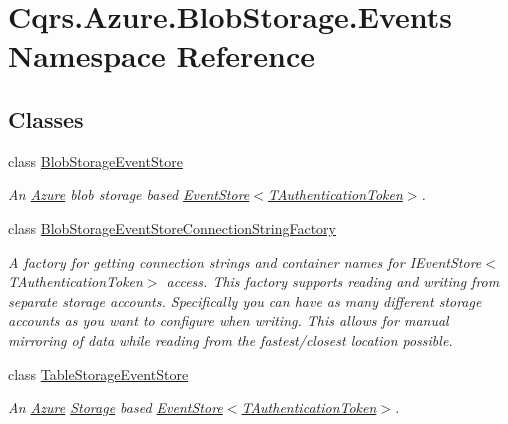 \hypertarget{namespaceCqrs_1_1Azure_1_1BlobStorage_1_1Events}{}\section{Cqrs.\+Azure.\+Blob\+Storage.\+Events Namespace Reference}
\label{namespaceCqrs_1_1Azure_1_1BlobStorage_1_1Events}
\subsection*{Classes}
\begin{DoxyCompactItemize}
\item 
class \hyperlink{classCqrs_1_1Azure_1_1BlobStorage_1_1Events_1_1BlobStorageEventStore}{Blob\+Storage\+Event\+Store}
\begin{DoxyCompactList}\small\item\em An \hyperlink{namespaceCqrs_1_1Azure}{Azure} blob storage based \hyperlink{classCqrs_1_1Events_1_1EventStore_a6346cb2aea4c5b4e740dc6cfb15abab8_a6346cb2aea4c5b4e740dc6cfb15abab8}{Event\+Store$<$\+T\+Authentication\+Token$>$}. \end{DoxyCompactList}\item 
class \hyperlink{classCqrs_1_1Azure_1_1BlobStorage_1_1Events_1_1BlobStorageEventStoreConnectionStringFactory}{Blob\+Storage\+Event\+Store\+Connection\+String\+Factory}
\begin{DoxyCompactList}\small\item\em A factory for getting connection strings and container names for I\+Event\+Store$<$\+T\+Authentication\+Token$>$ access. This factory supports reading and writing from separate storage accounts. Specifically you can have as many different storage accounts as you want to configure when writing. This allows for manual mirroring of data while reading from the fastest/closest location possible. \end{DoxyCompactList}\item 
class \hyperlink{classCqrs_1_1Azure_1_1BlobStorage_1_1Events_1_1TableStorageEventStore}{Table\+Storage\+Event\+Store}
\begin{DoxyCompactList}\small\item\em An \hyperlink{namespaceCqrs_1_1Azure}{Azure} \hyperlink{namespaceCqrs_1_1Azure_1_1Storage}{Storage} based \hyperlink{classCqrs_1_1Events_1_1EventStore_a6346cb2aea4c5b4e740dc6cfb15abab8_a6346cb2aea4c5b4e740dc6cfb15abab8}{Event\+Store$<$\+T\+Authentication\+Token$>$}. \end{DoxyCompactList}\item 

\end{DoxyCompactItemize}
